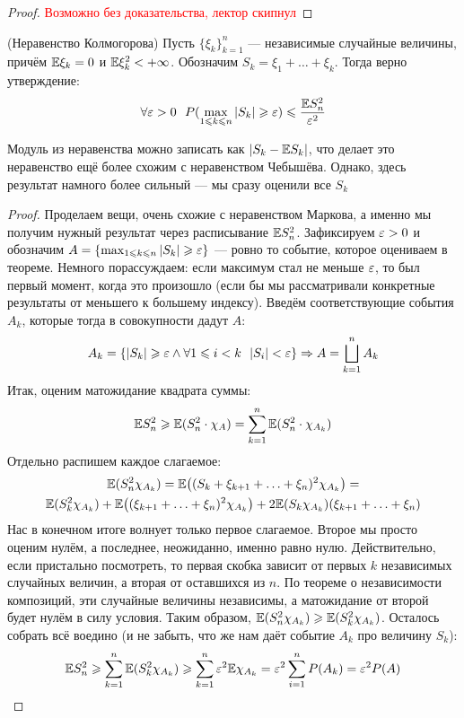 \begin{proof}
	\textcolor{red}{Возможно без доказательства, лектор скипнул}
\end{proof}

\begin{theorem} (Неравенство Колмогорова)
	Пусть $\{\xi_k\}_{k = 1}^n$ --- независимые случайные величины, причём $\mathbb{E}\xi_k = 0$ и $\mathbb{E}\xi_k^2 < +\infty$. Обозначим $S_k = \xi_1 + \ldots + \xi_k$. Тогда верно утверждение:
	\[
		\forall \varepsilon > 0\ \ P(\max_{1 \leqslant k \leqslant n} |S_k| \geqslant \varepsilon) \leqslant \frac{\mathbb{E} S_n^2}{\varepsilon^2}
	\]
\end{theorem}

\begin{note}
	Модуль из неравенства можно записать как $|S_k - \mathbb{E} S_k|$, что делает это неравенство ещё более схожим с неравенством Чебышёва. Однако, здесь результат намного более сильный --- мы сразу оценили все $S_k$
\end{note}

\begin{proof}
	Проделаем вещи, очень схожие с неравенством Маркова, а именно мы получим нужный результат через расписывание $\mathbb{E} S_n^2$. Зафиксируем $\varepsilon > 0$ и обозначим $A = \{\max_{1 \leqslant k \leqslant n} |S_k| \geqslant \varepsilon\}$ --- ровно то событие, которое оцениваем в теореме. Немного порассуждаем: если максимум стал не меньше $\varepsilon$, то был первый момент, когда это произошло (если бы мы рассматривали конкретные результаты от меньшего к большему индексу). Введём соответствующие события $A_k$, которые тогда в совокупности дадут $A$:
	\[
		A_k = \{|S_k| \geqslant \varepsilon \wedge \forall 1 \leqslant i < k\ \ |S_i| < \varepsilon\}\Rightarrow A = \bigsqcup_{k = 1}^n A_k
	\]
	Итак, оценим матожидание квадрата суммы:
	\[
		\mathbb{E} S_n^2 \geqslant \mathbb{E} (S_n^2 \cdot \chi_A) = \sum_{k = 1}^n \mathbb{E} (S_n^2 \cdot \chi_{A_k})
	\]
	Отдельно распишем каждое слагаемое:
	\begin{multline*}
		\mathbb{E} (S_n^2 \chi_{A_k}) = \mathbb{E}\big((S_k + \xi_{k + 1} + \ldots + \xi_n)^2 \chi_{A_k}\big) =
		\\
		\mathbb{E} (S_k^2\chi_{A_k}) + \mathbb{E}\big((\xi_{k + 1} + \ldots + \xi_n)^2\chi_{A_k}\big) + 2\mathbb{E}(S_k\chi_{A_k})(\xi_{k + 1} + \ldots + \xi_n)
	\end{multline*}
	Нас в конечном итоге волнует только первое слагаемое. Второе мы просто оценим нулём, а последнее, неожиданно, именно равно нулю. Действительно, если пристально посмотреть, то первая скобка зависит от первых $k$ независимых случайных величин, а вторая от оставшихся из $n$. По теореме о независимости композиций, эти случайные величины независимы, а матожидание от второй будет нулём в силу условия. Таким образом, $\mathbb{E}(S_n^2\chi_{A_k}) \geqslant \mathbb{E}(S_k^2\chi_{A_k})$. Осталось собрать всё воедино (и не забыть, что же нам даёт событие $A_k$ про величину $S_k$):
	\[
		\mathbb{E} S_n^2 \geqslant \sum_{k = 1}^n \mathbb{E}(S_k^2\chi_{A_k}) \geqslant \sum_{k = 1}^n \varepsilon^2\mathbb{E}\chi_{A_k} = \varepsilon^2 \sum_{i = 1}^n P(A_k) = \varepsilon^2 P(A)
	\]
\end{proof}

